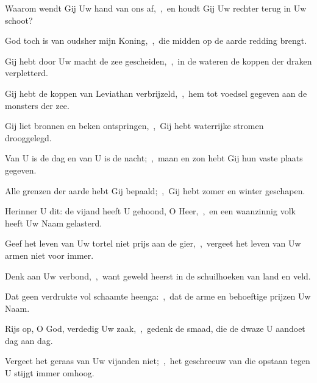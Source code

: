 \documentclass[12pt,twoside,a5paper]{article}
\begin{document}
\begin{halfparskip}
  Waarom wendt Gij Uw hand van ons af,~\sep\ en houdt Gij Uw rechter terug in Uw schoot?

  God toch is van oudsher mijn Koning,~\sep\ die midden op de aarde redding brengt.

  Gij hebt door Uw macht de zee gescheiden,~\sep\ in de wateren de koppen der draken verpletterd.

  Gij hebt de koppen van Leviathan verbrijzeld,~\sep\ hem tot voedsel gegeven aan de monsters der zee.

  Gij liet bronnen en beken ontspringen,~\sep\ Gij hebt waterrijke stromen drooggelegd.

  Van U is de dag en van U is de nacht;~\sep\ maan en zon hebt Gij hun vaste plaats gegeven.

  Alle grenzen der aarde hebt Gij bepaald;~\sep\ Gij hebt zomer en winter geschapen.

  Herinner U dit: de vijand heeft U gehoond, O Heer,~\sep\ en een waanzinnig volk heeft Uw Naam gelasterd.

  Geef het leven van Uw tortel niet prijs aan de gier,~\sep\ vergeet het leven van Uw armen niet voor immer.

  Denk aan Uw verbond,~\sep\ want geweld heerst in de schuilhoeken van land en veld.

  Dat geen verdrukte vol schaamte heenga:~\sep\ dat de arme en behoeftige prijzen Uw Naam.

  Rijs op, O God, verdedig Uw zaak,~\sep\ gedenk de smaad, die de dwaze U aandoet dag aan dag.

  Vergeet het geraas van Uw vijanden niet;~\sep\ het geschreeuw van die opstaan tegen U stijgt immer omhoog.
\end{halfparskip}
\end{document}
